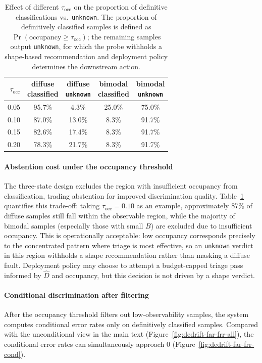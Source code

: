 \begin{table}[!htbp]
\centering
\small
\begin{tabular}{rcccc}
\toprule
$\tau_{\text{occ}}$ & \shortstack{diffuse\\classified} & \shortstack{diffuse\\\texttt{unknown}} & \shortstack{bimodal\\classified} & \shortstack{bimodal\\\texttt{unknown}} \\
\midrule
0.05 & 95.7\% & 4.3\% & 25.0\% & 75.0\% \\
0.10 & 87.0\% & 13.0\% & 8.3\% & 91.7\% \\
0.15 & 82.6\% & 17.4\% & 8.3\% & 91.7\% \\
0.20 & 78.3\% & 21.7\% & 8.3\% & 91.7\% \\
\bottomrule
\end{tabular}
\caption{Effect of different $\tau_{\text{occ}}$ on the proportion of definitive classifications vs.\ \texttt{unknown}. The proportion of definitively classified samples is defined as $\Pr(\text{occupancy}\ge\tau_{\text{occ}})$; the remaining samples output \texttt{unknown}, for which the probe withholds a shape-based recommendation and deployment policy determines the downstream action.}
\label{tab:c3-5}
\end{table}

\paragraph{Abstention cost under the occupancy threshold}
The three-state design excludes the region with insufficient occupancy from classification, trading abstention for improved discrimination quality. Table~\ref{tab:c3-5} quantifies this trade-off: taking $\tau_{\text{occ}}{=}0.10$ as an example, approximately 87\% of diffuse samples still fall within the observable region, while the majority of bimodal samples (especially those with small $B$) are excluded due to insufficient occupancy. This is operationally acceptable: low occupancy corresponds precisely to the concentrated pattern where triage is most effective, so an \texttt{unknown} verdict in this region withholds a shape recommendation rather than masking a diffuse fault. Deployment policy may choose to attempt a budget-capped triage pass informed by $\hat{D}$ and occupancy, but this decision is not driven by a shape verdict.



\paragraph{Conditional discrimination after filtering}
After the occupancy threshold filters out low-observability samples, the system computes conditional error rates only on definitively classified samples. Compared with the unconditional view in the main text (Figure~\ref{fig:dedrift-far-frr-all}), the conditional error rates can simultaneously approach 0 (Figure~\ref{fig:dedrift-far-frr-cond}).

